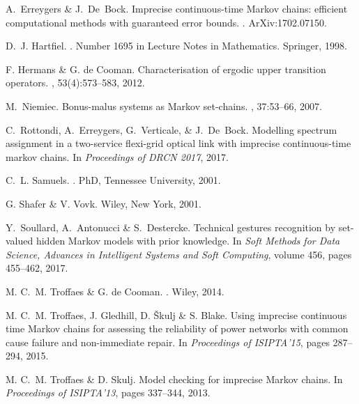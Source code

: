 \documentclass[11pt,dvipsnames,usenames,a4paper]{article}
\begin{document}
\begin{thebibliography}{10}
A.~Erreygers \& J.~De~Bock.
\newblock Imprecise continuous-time {M}arkov chains: efficient computational
  methods with guaranteed error bounds.
.
\newblock ArXiv:1702.07150.

D.~J. Hartfiel.
.
\newblock Number 1695 in Lecture Notes in Mathematics. Springer, 1998.

F. Hermans \& G. {d}e Cooman.
\newblock Characterisation of ergodic upper transition operators.
, 53(4):573--583,
  2012.

M.~Niemiec.
\newblock Bonus-malus systems as {M}arkov set-chains.
, 37:53--66, 2007.

C.~Rottondi, A.~Erreygers, G.~Verticale, \& J.~De~Bock.
\newblock Modelling spectrum assignment in a two-service flexi-grid optical
  link with imprecise continuous-time markov chains.
\newblock In {\em Proceedings of DRCN 2017}, 2017.

C.~L. Samuels.
.
\newblock PhD, Tennessee University, 2001.

G. Shafer \& V. Vovk.
\newblock Wiley, New York, 2001.

Y.~Soullard, A.~Antonucci \& S.~Destercke.
\newblock Technical gestures recognition by set-valued hidden {M}arkov models
  with prior knowledge.
\newblock In {\em Soft Methods for Data Science, Advances in Intelligent
  Systems and Soft Computing}, volume 456, pages 455--462, 2017.

M. C.~M. Troffaes \& G. {d}e Cooman.
.
\newblock Wiley, 2014.

M. C.~M. Troffaes, J. Gledhill, D. \v{S}kulj \& S. Blake.
\newblock Using imprecise continuous time {M}arkov chains for assessing the
  reliability of power networks with common cause failure and non-immediate
  repair.
\newblock In {\em Proceedings of ISIPTA'15}, pages 287--294, 2015.

M. C.~M. Troffaes \& D. Skulj.
\newblock Model checking for imprecise {M}arkov chains.
\newblock In {\em Proceedings of ISIPTA'13},
  pages 337--344, 2013.


\end{thebibliography}
\end{document}
